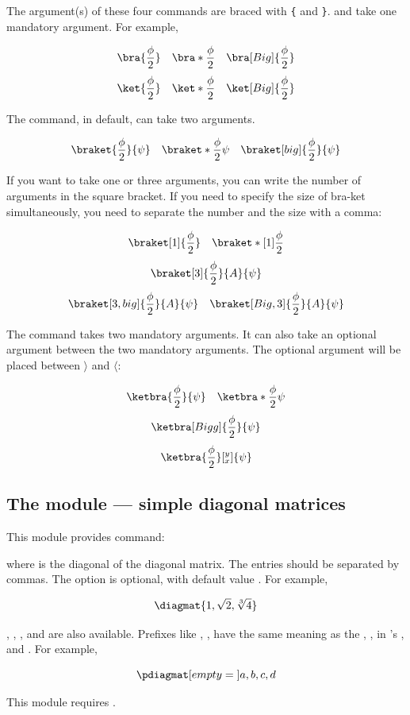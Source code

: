 \documentclass[11pt,letterpaper]{article}
\begin{document}
The argument(s) of these four commands are braced with \verb|{| and \verb|}|.
 and  take one mandatory argument. For example,
\begin{example}
\def\0{\frac\phi2}
\[ \bra {\0} \quad \bra* {\0}
             \quad \bra[Big] {\0} \]
\[ \ket {\0} \quad \ket* {\0}
             \quad \ket[Big] {\0} \]
\end{example}
The  command, in default, can take two arguments.
\begin{example}
\def\0{\frac\phi2}
\[ \braket {\0} {\psi}   \quad
   \braket*{\0} {\psi}   \quad
   \braket[big] {\0} {\psi} \]
\end{example}
If you want  to take one or three arguments, you can write the
number of arguments in the square bracket. If you need to specify the size
of bra-ket simultaneously, you need to separate the number and the size with
a comma:
\begin{example}
\def\0{\frac\phi2}
\[ \braket [1] {\0} \quad
   \braket*[1] {\0} \]
\[ \braket [3] {\0}{A}{\psi}    \]
\[ \braket[3,big] {\0}{A}{\psi}
     \quad
   \braket[Big,3] {\0}{A}{\psi} \]
\end{example}
The  command takes two mandatory arguments. It can also take an
optional argument between the two mandatory arguments. The optional argument
will be placed between $\rangle$ and $\langle$:
\begin{example}
\def\0{\frac\phi2}
\[ \ketbra  {\0} {\psi}    \quad
   \ketbra* {\0} {\psi}       \]
\[ \ketbra [Bigg] {\0} {\psi} \]
\[ \ketbra {\0} [_x^y] {\psi} \]
\end{example}
\endgroup

\subsection{The  module --- simple diagonal matrices}
This module provides  command:
\begin{center}
\opt{[empty\:=\:}\opt{]}
\end{center}
where  is the diagonal of the diagonal matrix. The entries should
be separated by commas. The  option is optional, with default value
. For example,
\begin{example}
\[
  \diagmat { 1, \sqrt2, \sqrt[3]4 }
\]
\end{example}
, , ,  and 
are also available. Prefixes like , ,  have the same
meaning as the , ,  in 's ,
 and . For example,
\begin{example}
\[
  \pdiagmat [ empty = {} ]
    { a, b, c, d }
\]
\end{example}
This module requires .
\end{document}
